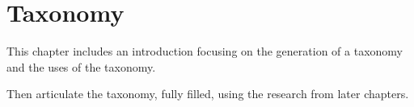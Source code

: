\chapter{Taxonomy}

This chapter includes an introduction focusing on the generation of a taxonomy and the uses of the taxonomy.

Then articulate the taxonomy, fully filled, using the research from later chapters.